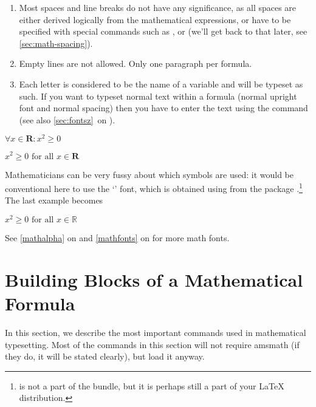 \begin{enumerate}

  \item{} Most spaces and line breaks do not have any significance, as all spaces
  are either derived logically from the mathematical expressions, or
  have to be specified with special commands such as \csi{,},  or
   (we'll get back to that later, see \autoref{sec:math-spacing}).

  \item Empty lines are not allowed. Only one paragraph per formula.

  \item Each letter is considered to be the name of a variable and will be
        typeset as such. If you want to typeset normal text within a formula
        (normal upright font and normal spacing) then you have to enter the
        text using the  command (see also \autoref{sec:fontsz}~on
        ).

\end{enumerate}
\begin{example}
$\forall x \in \mathbf{R}
  \colon x^{2} \geq 0$
\end{example}
\begin{example}
$x^{2} \geq 0 \text{ for all }
  x\in\mathbf{R}$
\end{example}

Mathematicians can be very fussy about which symbols are used:
it would be conventional here to use the `' font,%
 which is obtained using  from the
package .\footnote{ is not a part
  of the  bundle, but it is perhaps still a part of your \LaTeX{}
  distribution.}
The last example becomes
\begin{example}
$x^{2} \geq 0
 \text{ for all } x 
 \in \mathbb{R}$
\end{example}
See \autoref{mathalpha} on  and
\autoref{mathfonts} on  for more math fonts.

\section{Building Blocks of a Mathematical Formula}

In this section, we describe the most important commands used in mathematical
typesetting. Most of the commands in this section will not require
\textsf{amsmath} (if they do, it will be stated clearly), but load it anyway.

